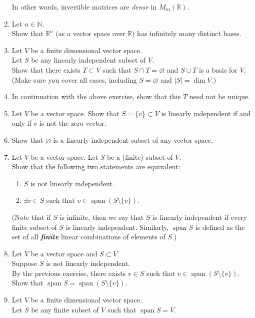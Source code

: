 \documentclass[12pt]{article}
\let\emptyset\varnothing
\begin{document}
\begin{enumerate}[leftmargin=*]
	In other words, invertible matrices are \emph{dense} in $M_m(\mathbb{R}).$
	\item Let $n \in \mathbb{N}.$\\
	Show that $\mathbb{R}^n$ (as a vector space over $\mathbb{R}$) has infinitely many distinct bases.
	\item Let $V$ be a finite dimensional vector space.\\
	Let $S$ be any linearly independent subset of $V.$\\
	Show that there exists $T \subset V$ such that $S \cap T = \emptyset$ and $S \cup T$ is a basis for $V.$\\
	(Make sure you cover all cases, including $S = \emptyset$ and $|S| = \dim V.$)
	\item In continuation with the above exercise, show that this $T$ need not be unique.
	\item Let $V$ be a vector space. Show that $S = \{v\} \subset V$ is linearly independent if and only if $v$ is not the zero vector.
	\item Show that $\emptyset$ is a linearly independent subset of any vector space.
	\item Let $V$ be a vector space. Let $S$ be a (finite) subset of $V.$\\
	Show that the following two statements are equivalent:
	\begin{enumerate} 
		\item $S$ is not linearly independent.
		\item $\exists v \in S$ such that $v \in \operatorname{span}(S\setminus\{v\}).$
	\end{enumerate}
	(Note that if $S$ is infinite, then we say that $S$ is linearly independent if every finite subset of $S$ is linearly independent. Similarly, $\operatorname{span} S$ is defined as the set of all \textbf{\emph{finite}} linear combinations of elements of $S.$)
	\item Let $V$ be a vector space and $S \subset V.$\\
	Suppose $S$ is not linearly independent.\\
	By the previous exercise, there exists $v \in S$ such that $v \in \operatorname{span}(S\setminus\{v\}).$\\
	Show that $\operatorname{span} S = \operatorname{span}(S\setminus\{v\}).$
	\item Let $V$ be a finite dimensional vector space.\\
	Let $S$ be any finite subset of $V$ such that $\operatorname{span} S = V.$\\

\end{enumerate}
\end{document}
